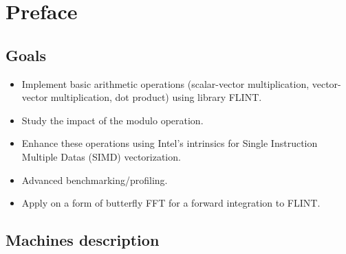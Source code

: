 \documentclass[a4paper]{article}
\begin{document}
\newpage
\section{Preface}

\subsection{Goals}
\begin{itemize}
    \item Implement basic arithmetic operations (scalar-vector multiplication, vector-vector multiplication, dot product) using library FLINT.
    \item Study the impact of the modulo operation.
    \item Enhance these operations using Intel's intrinsics for Single Instruction Multiple Datas (SIMD) vectorization.
    \item Advanced benchmarking/profiling.
    \item Apply on a form of butterfly FFT for a forward integration to FLINT.
\end{itemize}

\subsection{Machines description}


\end{document}
